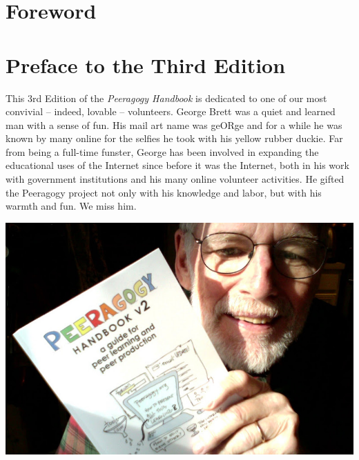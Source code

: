 \documentclass[ebook,12pt, twoside]{memoir}
\let\sc\scshape
\let\sc\scshape
\begin{document}

\clearpage
\chapter*{Foreword}
\pagestyle{companion}
\markboth{{\sc Foreword}}{{\sc Foreword}}
%


\newpage
\chapter*{Preface to the Third Edition}

This 3rd Edition of the \emph{Peeragogy Handbook} is dedicated to one
of our most convivial -- indeed, lovable -- volunteers. George Brett
was a quiet and learned man with a sense of fun.  His mail art name
was geORge and for a while he was known by many online for the selfies
he took with his yellow rubber duckie. Far from being a full-time
funster, George has been involved in expanding the educational uses of
the Internet since before it was the Internet, both in his work with
government institutions and his many online volunteer activities. He
gifted the Peeragogy project not only with his knowledge and labor,
but with his warmth and fun.  We miss him.

\begin{center}
 \includegraphics[width=.8\textwidth]{../pictures/george.jpg}
\end{center}
\end{document}
